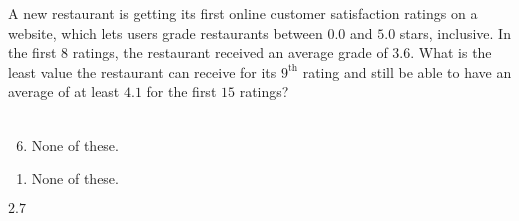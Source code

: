  
A new restaurant is getting its first online customer satisfaction ratings on a website, which lets users grade restaurants between $0.0$ and $5.0$ stars, inclusive.  In the first $8$ ratings, the restaurant received an average grade of $3.6$.  What is the least value the restaurant can receive for its $9^{\mathrm{th}}$ rating and still be able to have an average of at least $4.1$ for the first $15$ ratings?\\ \\


\ifsat
	\begin{enumerate}[label=\Alph*)]
	\end{enumerate}
\else
\fi

\ifacteven
	\begin{enumerate}[label=\textbf{\Alph*.},itemsep=\fill,align=left]
		\setcounter{enumii}{5}
		\item None of these. 
	\end{enumerate}
\else
\fi

\ifactodd
	\begin{enumerate}[label=\textbf{\Alph*.},itemsep=\fill,align=left]
		\item None of these. 
	\end{enumerate}
\else
\fi

\ifgridin
$2.7$
\else
\fi

